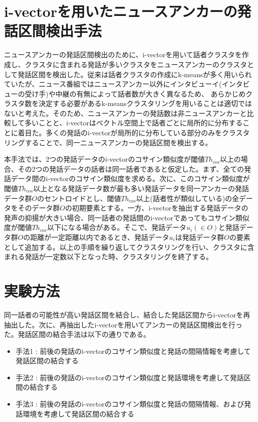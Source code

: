 \section{i-vectorを用いたニュースアンカーの発話区間検出手法\cite{nozaki_gakuseikai}}
\label{section:clustering}
ニュースアンカーの発話区間検出のために、i-vectorを用いて話者クラスタを作成し、クラスタに含まれる発話が多いクラスタをニュースアンカーのクラスタとして発話区間を検出した。従来は話者クラスタの作成にk-meansが多く用いられていたが、ニュース番組ではニュースアンカー以外にインタビューイ(インタビューの受け手)や中継の有無によって話者数が大きく異なるため、
あらかじめクラスタ数を決定する必要があるk-meansクラスタリングを用いることは適切ではないと考えた。そのため、ニュースアンカーの発話数は非ニュースアンカーと比較して多いことと、i-vectorはベクトル空間上で話者ごとに局所的に分布することに着目た。多くの発話のi-vectorが局所的に分布している部分のみをクラスタリングすることで、同一ニュースアンカーの発話区間を検出する。\par
本手法では、2つの発話データのi-vectorのコサイン類似度が閾値$Th_{cos}$以上の場合、その2つの発話データの話者は同一話者であると仮定した。まず、全ての発話データ間のi-vectorのコサイン類似度を求める。次に、このコサイン類似度が閾値$Th_{cos}$以上となる発話データ数が最も多い発話データを同一アンカーの発話データ群$O$のセントロイドとし、閾値$Th_{cos}$以上(話者性が類似している)の全データをそのデータ群$O$の初期要素とする。一方、i-vectorを抽出する発話データの発声の抑揚が大きい場合、同一話者の発話間のi-vectorであってもコサイン類似度が閾値$Th_{cos}$以下になる場合がある。そこで、発話データ$u_i(\in O)$と発話データ群$O$の距離が一定距離以内であるとき、発話データ$u_i$は発話データ群$O$の要素として追加する。以上の手順を繰り返してクラスタリングを行い、クラスタに含まれる発話が一定数以下となった時、クラスタリングを終了する。\par

\section{実験方法}
同一話者の可能性が高い発話区間を結合し、結合した発話区間からi-vectorを再抽出した。次に、再抽出したi-vectorを用いてアンカーの発話区間検出を行った。発話区間の結合手法は以下の通りである。

\begin{itemize}
\item 手法1 : 前後の発話のi-vectorのコサイン類似度と発話の間隔情報を考慮して発話区間の結合する
\item 手法2 : 前後の発話のi-vectorのコサイン類似度と発話環境を考慮して発話区間の結合する
\item 手法3 : 前後の発話のi-vectorのコサイン類似度と発話の間隔情報、および発話環境を考慮して発話区間の結合する
\end{itemize}

